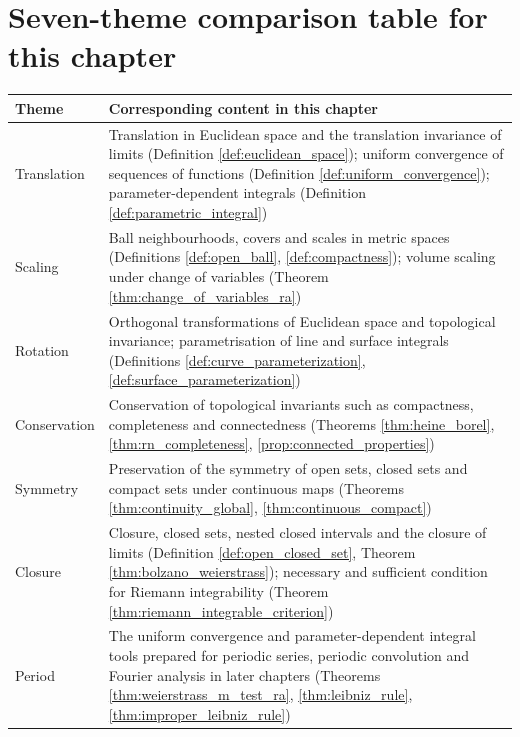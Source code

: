 \section*{Seven-theme comparison table for this chapter}

\begingroup
\renewcommand{\arraystretch}{1.3}
\begin{longtable}{>{\raggedright\arraybackslash}p{3cm}>{\raggedright\arraybackslash}p{10.5cm}}
\toprule
Theme & Corresponding content in this chapter \\
\midrule
Translation & Translation in Euclidean space and the translation invariance of limits (Definition \ref{def:euclidean_space}); uniform convergence of sequences of functions (Definition \ref{def:uniform_convergence}); parameter-dependent integrals (Definition \ref{def:parametric_integral}) \\
Scaling & Ball neighbourhoods, covers and scales in metric spaces (Definitions \ref{def:open_ball}, \ref{def:compactness}); volume scaling under change of variables (Theorem \ref{thm:change_of_variables_ra}) \\
Rotation & Orthogonal transformations of Euclidean space and topological invariance; parametrisation of line and surface integrals (Definitions \ref{def:curve_parameterization}, \ref{def:surface_parameterization}) \\
Conservation & Conservation of topological invariants such as compactness, completeness and connectedness (Theorems \ref{thm:heine_borel}, \ref{thm:rn_completeness}, \ref{prop:connected_properties}) \\
Symmetry & Preservation of the symmetry of open sets, closed sets and compact sets under continuous maps (Theorems \ref{thm:continuity_global}, \ref{thm:continuous_compact}) \\
Closure & Closure, closed sets, nested closed intervals and the closure of limits (Definition \ref{def:open_closed_set}, Theorem \ref{thm:bolzano_weierstrass}); necessary and sufficient condition for Riemann integrability (Theorem \ref{thm:riemann_integrable_criterion}) \\
Period & The uniform convergence and parameter-dependent integral tools prepared for periodic series, periodic convolution and Fourier analysis in later chapters (Theorems \ref{thm:weierstrass_m_test_ra}, \ref{thm:leibniz_rule}, \ref{thm:improper_leibniz_rule}) \\
\bottomrule
\end{longtable}
\endgroup

\clearpage

